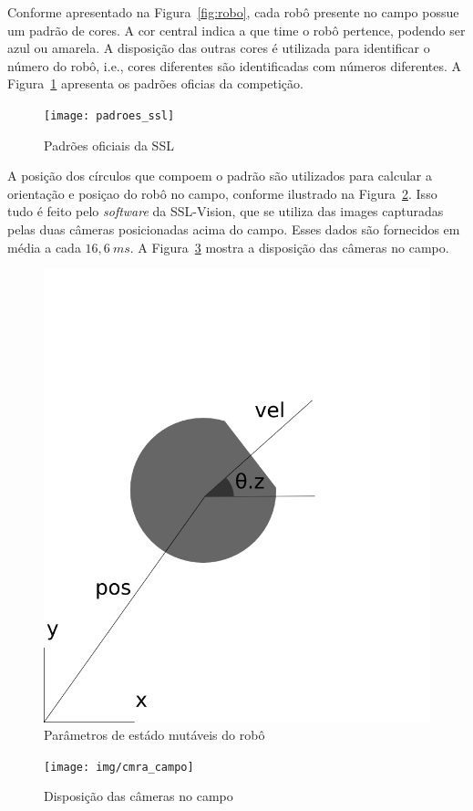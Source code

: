 Conforme apresentado na Figura~\ref{fig:robo}, cada robô presente no campo possue
um padrão de cores. A cor central indica a que time o robô pertence, podendo ser
azul ou amarela. A disposição das outras cores é utilizada para identificar o número
do robô, i.e., cores diferentes são identificadas com números diferentes. A
Figura~\ref{fig:padroes_ssl} apresenta os padrões oficias da competição.

\begin{figure}[thpb]
  \centering
  \texttt{[image: padroes\_ssl]}
  \caption{Padrões oficiais da SSL~\cite{zickler-ssl}}\label{fig:padroes_ssl}
\end{figure}

A posição dos círculos que compoem o padrão são utilizados para calcular a orientação
e posiçao do robô no campo, conforme ilustrado na Figura~\ref{fig:rob_data}. Isso
tudo é feito pelo \textit{software} da SSL-Vision, que se utiliza das images capturadas
pelas duas câmeras posicionadas acima do campo. Esses dados são fornecidos em média a
cada $16,6{\ }ms$. A Figura~\ref{fig:cmra_campo} mostra a disposição das câmeras no
campo.

\begin{figure}[thpb]
  \centering
  \includegraphics[width=0.5\linewidth]{img/rob_data}
  \caption{Parâmetros de estádo mutáveis do robô}\label{fig:rob_data}
\end{figure}

\begin{figure}[thpb]
  \centering
  \texttt{[image: img/cmra\_campo]}
  \caption{Disposição das câmeras no campo}\label{fig:cmra_campo}
\end{figure}
